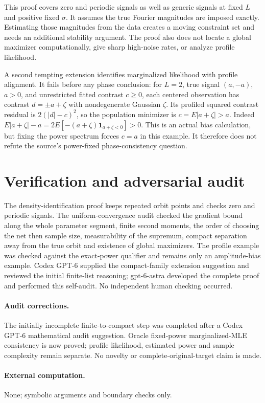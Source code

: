 \documentclass[11pt]{article}
\begin{document}
This proof covers zero and periodic signals as well as generic signals at
fixed $L$ and positive fixed $\sigma$. It assumes the true Fourier magnitudes
are imposed exactly. Estimating those magnitudes from the data creates a
moving constraint set and needs an additional stability argument. The proof
also does not locate a global maximizer computationally, give sharp high-noise
rates, or analyze profile likelihood.

A second tempting extension identifies marginalized likelihood with profile
alignment. It fails before any phase conclusion: for $L=2$, true signal
$(a,-a)$, $a>0$, and unrestricted fitted contrast $c\ge0$, each centered
observation has contrast $d=\pm a+\zeta$ with nondegenerate Gaussian $\zeta$.
Its profiled squared contrast residual is $2(|d|-c)^2$, so the population
minimizer is $c=E|a+\zeta|>a$. Indeed
$E|a+\zeta|-a=2E[-(a+\zeta)\mathbf1_{a+\zeta<0}]>0$.
This is an actual bias calculation, but fixing the power spectrum forces
$c=a$ in this example. It therefore does not refute the source's power-fixed
phase-consistency question.
\section{Verification and adversarial audit}
The density-identification proof keeps repeated orbit points and checks
zero and periodic signals. The uniform-convergence audit checked the gradient
bound along the whole parameter segment, finite second moments, the order of
choosing the net then sample size, measurability of the supremum, compact
separation away from the true orbit and existence of global maximizers. The
profile example was checked against the exact-power qualifier and remains only
an amplitude-bias example. Codex GPT-6 supplied the compact-family extension
suggestion and reviewed the initial finite-list reasoning; gpt-6-astra developed
the complete proof and performed this self-audit. No independent human checking
occurred.
\paragraph{Audit corrections.} The initially incomplete finite-to-compact step was completed after a Codex GPT-6 mathematical audit suggestion. Oracle fixed-power marginalized-MLE consistency is now proved; profile likelihood, estimated power and sample complexity remain separate. No novelty or complete-original-target claim is made.
\paragraph{External computation.} None; symbolic arguments and boundary checks only.
\end{document}
